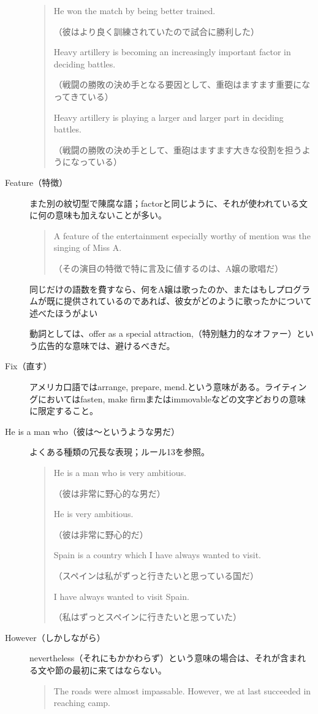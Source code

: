 \begin{description}
\begin{quote}
He won the match by being better trained.

（彼はより良く訓練されていたので試合に勝利した）

Heavy artillery is becoming an increasingly important factor in
deciding battles.

（戦闘の勝敗の決め手となる要因として、重砲はますます重要になってきている）

Heavy artillery is playing a larger and larger part in deciding
battles.

（戦闘の勝敗の決め手として、重砲はますます大きな役割を担うようになっている）
\end{quote}
\item [Feature（特徴）] また別の紋切型で陳腐な語；factorと同じように、それが使われている文に何の意味も加えないことが多い。
\begin{quote}
    A feature of the entertainment especially worthy of mention was
the singing of Miss A.

（その演目の特徴で特に言及に値するのは、A嬢の歌唱だ）

\end{quote}
同じだけの語数を費すなら、何をA嬢は歌ったのか、またはもしプログラムが既に提供されているのであれば、彼女がどのように歌ったかについて述べたほうがよい
\par 動詞としては、offer as a special attraction,（特別魅力的なオファー）という広告的な意味では、避けるべきだ。
\item [Fix（直す）]アメリカ口語ではarrange, prepare,
mend.という意味がある。ライティングにおいてはfasten, make
firmまたはimmovableなどの文字どおりの意味に限定すること。
\item [He is a man who（彼は～というような男だ）]よくある種類の冗長な表現；ルール13を参照。
\begin{quote}
    He is a man who is very ambitious.
    
    （彼は非常に野心的な男だ）
    
    He is very ambitious.
    
    （彼は非常に野心的だ）
    
    Spain is a country which I have always wanted to visit.
    
    （スペインは私がずっと行きたいと思っている国だ）
    
    I have always wanted to visit Spain.
    
    （私はずっとスペインに行きたいと思っていた）
\end{quote}
\item [However（しかしながら）]nevertheless（それにもかかわらず）という意味の場合は、それが含まれる文や節の最初に来てはならない。
\begin{quote}
    The roads were almost impassable. However, we at last succeeded in
reaching camp.


\end{quote}
\end{description}
